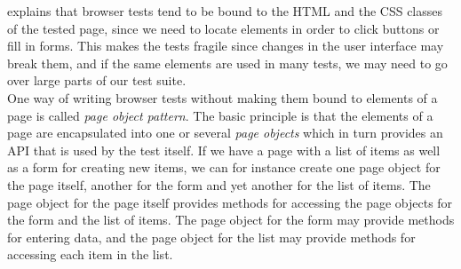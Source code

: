\citet{web:page_object} explains that browser tests tend to be bound to
the HTML and the CSS classes of the tested page, since we need to locate
elements in order to click buttons or fill in forms. This makes the
tests fragile since changes in the user interface may break them, and if
the same elements are used in many tests, we may need to go over large
parts of our test suite.\\

One way of writing browser tests without making them bound to elements
of a page is called \emph{page object pattern}. The basic principle is
that the elements of a page are encapsulated into one or several
\emph{page objects} which in turn provides an API that is used by the
test itself. If we have a page with a list of items as well as a form
for creating new items, we can for instance create one page object for
the page itself, another for the form and yet another for the list of
items. The page object for the page itself provides methods for
accessing the page objects for the form and the list of items. The page
object for the form may provide methods for entering data, and the page
object for the list may provide methods for accessing each item in the
list.\cite{web:page_object}

